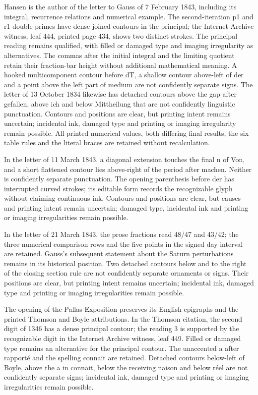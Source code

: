 Hansen is the author of the letter to Gauss of 7 February 1843, including its integral, recurrence relations and numerical example. The second-iteration p1 and r1 double primes have dense joined contours in the principal; the Internet Archive witness, leaf 444, printed page 434, shows two distinct strokes. The principal reading remains qualified, with filled or damaged type and imaging irregularity as alternatives. The commas after the initial integral and the limiting quotient retain their fraction-bar height without additional mathematical meaning. A hooked multicomponent contour before dT, a shallow contour above-left of der and a point above the left part of medium are not confidently separate signs. The letter of 13 October 1834 likewise has detached contours above the gap after gefallen, above ich and below Mittheilung that are not confidently linguistic punctuation. Contours and positions are clear, but printing intent remains uncertain; incidental ink, damaged type and printing or imaging irregularity remain possible. All printed numerical values, both differing final results, the six table rules and the literal braces are retained without recalculation.

In the letter of 11 March 1843, a diagonal extension touches the final n of Von, and a short flattened contour lies above-right of the period after machen. Neither is confidently separate punctuation. The opening parenthesis before der has interrupted curved strokes; its editable form records the recognizable glyph without claiming continuous ink. Contours and positions are clear, but causes and printing intent remain uncertain; damaged type, incidental ink and printing or imaging irregularities remain possible.

In the letter of 21 March 1843, the prose fractions read 48/47 and 43/42; the three numerical comparison rows and the five points in the signed day interval are retained. Gauss’s subsequent statement about the Saturn perturbations remains in its historical position. Two detached contours below and to the right of the closing section rule are not confidently separate ornaments or signs. Their positions are clear, but printing intent remains uncertain; incidental ink, damaged type and printing or imaging irregularities remain possible.

The opening of the Pallas Exposition preserves its English epigraphs and the printed Thomson and Boyle attributions. In the Thomson citation, the second digit of 1346 has a dense principal contour; the reading 3 is supported by the recognizable digit in the Internet Archive witness, leaf 449. Filled or damaged type remains an alternative for the principal contour. The unaccented a after rapporté and the spelling connait are retained. Detached contours below-left of Boyle, above the a in connait, below the receiving naison and below réel are not confidently separate signs; incidental ink, damaged type and printing or imaging irregularities remain possible.

